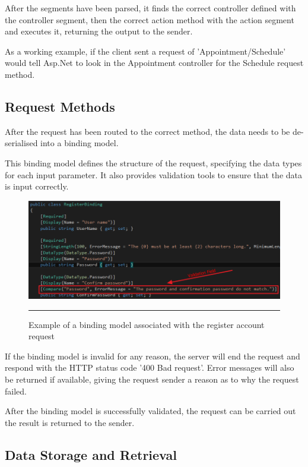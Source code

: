 After the segments have been parsed, it finds the correct controller defined with the controller segment, then the correct action method with the action segment and executes it, returning the output to the sender.

As a working example, if the client sent a request of 'Appointment/Schedule' would tell Asp.Net to look in the Appointment controller for the Schedule request method.

\subsection{Request Methods}

After the request has been routed to the correct method, the data needs to be de-serialised into a binding model.

This binding model defines the structure of the request, specifying the data types for each input parameter. It also provides validation tools to ensure that the data is input correctly.

\begin{figure}[htbp]
	\centering
		\includegraphics[width=\textwidth,height=\textheight,keepaspectratio]{Figures/bindingmodel.png}
		\rule{35em}{0.5pt}
		\caption[Example of a binding model associated with the register account request]{Example of a binding model associated with the register account request}
	\label{fig:bindingmodel}
\end{figure}

If the binding model is invalid for any reason, the server will end the request and respond with the HTTP status code '400 Bad request'. Error messages will also be returned if available, giving the request sender a reason as to why the request failed.

After the binding model is successfully validated, the request can be carried out the result is returned to the sender.

\subsection{Data Storage and Retrieval}

